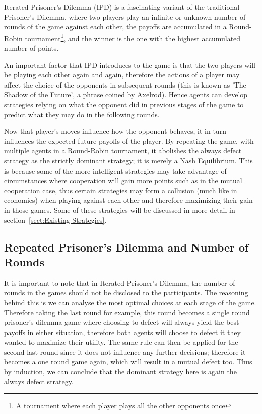 \documentclass{icldt}
\numberwithin{equation}{section}       %
\begin{document}
Iterated Prisoner's Dilemma (IPD) is a fascinating variant of the traditional Prisoner's Dilemma, where two players play an infinite or unknown number of rounds of the game against each other, the payoffs are accumulated in a Round-Robin tournament\footnote{A tournament where each player plays all the other opponents once}, and the winner is the one with the highest accumulated number of points. 

An important factor that IPD introduces to the game is that the two players will be playing each other again and again, therefore the actions of a player may affect the choice of the opponents in subsequent rounds (this is known as 'The Shadow of the Future', a phrase coined by Axelrod). Hence agents can develop strategies relying on what the opponent did in previous stages of the game to predict what they may do in the following rounds. 

Now that player's moves influence how the opponent behaves, it in turn influences the expected future payoffs of the player. By repeating the game, with multiple agents in a Round-Robin tournament, it abolishes the always defect strategy as the strictly dominant strategy; it is merely a Nash Equilibrium. This is because some of the more intelligent strategies may take advantage of circumstances where cooperation will gain more points such as in the mutual cooperation case, thus certain strategies may form a collusion  (much like in economics) when playing against each other and therefore maximizing their gain in those games. Some of these strategies will be discussed in more detail in section~\ref{sect:Existing Strategies}.

\subsection{Repeated Prisoner's Dilemma and Number of Rounds}
It is important to note that in Iterated Prisoner's Dilemma, the number of rounds in the games should not be disclosed to the participants. The reasoning behind this is we can analyse the most optimal choices at each stage of the game. Therefore taking the last round for example, this round becomes a single round prisoner's dilemma game where choosing to defect will always yield the best payoffs in either situation, therefore both agents will choose to defect it they wanted to maximize their utility. The same rule can then be applied for the second last round since it does not influence any further decisions; therefore it becomes a one round game again, which will result in a mutual defect too. Thus by induction, we can conclude that the dominant strategy here is again the always defect strategy\cite{begg2006economics}.
\end{document}
